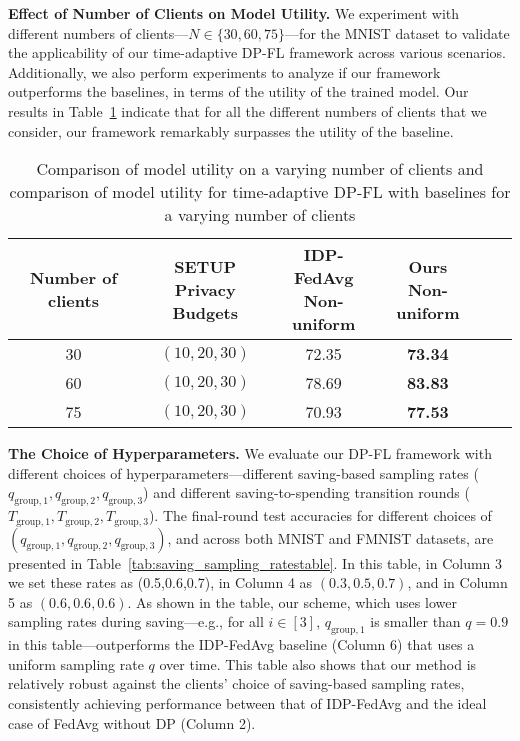 {\textbf{Effect of Number of Clients on Model Utility.} We experiment with different numbers of clients---$N\in\{30, 60, 75\}$---for the MNIST dataset to validate the applicability of our time-adaptive DP-FL framework across various scenarios. Additionally, we also perform experiments to analyze if our framework outperforms the baselines, in terms of the utility of the trained model. Our results in Table~\ref{tab:clientstable} indicate that for all the different numbers of clients that we consider, our framework remarkably surpasses the utility of the baseline. 



\begin{table}[h!]
\caption{Comparison of model utility on a varying number of clients and comparison of model utility for time-adaptive DP-FL with baselines for a varying number of clients}
\centering
\small 
\setlength{\tabcolsep}{10pt} 
\renewcommand{\arraystretch}{1.2}  
\begin{tabular}{cccccc}
\toprule
\textbf{Number of clients} & \makecell[tl]{\textbf{SETUP} \\ Privacy Budgets} &  \makecell[tl]{\textbf{IDP-FedAvg} \\ Non-uniform} & \makecell[tl]{\textbf{Ours}\\ Non-uniform}  \\ 
\midrule
30& $(10, 20, 30)$  & 72.35  & \textbf{73.34}  \\  
\midrule
60 & $(10, 20, 30)$    & 78.69   & \textbf{83.83} \\
\midrule
75 & $(10, 20, 30)$  &  70.93    & \textbf{77.53}\\ 
\bottomrule
\end{tabular}
\label{tab:clientstable}
\centering \vspace{-2ex}
\end{table}

\textbf{The Choice of Hyperparameters.} %
{We evaluate our DP-FL framework with different choices of hyperparameters---different saving-based sampling rates ($q_{\text{group},1},q_{\text{group},2},q_{\text{group},3}$) and different saving-to-spending transition rounds  ($T_{\text{group},1},T_{\text{group},2},T_{\text{group},3}$). The final-round test accuracies for different choices of $(q_{\text{group},1},q_{\text{group},2},q_{\text{group},3})$, and across both MNIST and FMNIST datasets, are presented in Table~\ref{tab:saving_sampling_ratestable}. In this table, in Column 3 we set these rates as (0.5,0.6,0.7), in Column 4 as $(0.3,0.5,0.7)$, and in Column 5 as $(0.6,0.6,0.6)$. As shown in the table, our scheme, which uses lower sampling rates during saving---e.g., for all $i\in [3]$, $q_{\text{group},1}$ is smaller than $q=0.9$ in this table---outperforms the IDP-FedAvg baseline (Column 6) that uses a uniform sampling rate $q$ over time. This table also shows that our method is relatively robust against the clients' choice of saving-based sampling rates, consistently achieving performance between that of IDP-FedAvg and the ideal case of FedAvg without DP (Column 2).}


}
